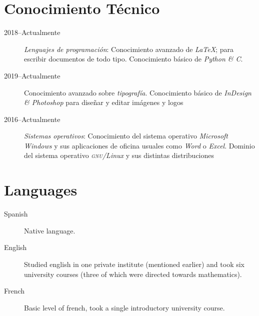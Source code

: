 \documentclass[draft,letterpaper,10pt]{article}
\newcommand{\entryone}[2]{
{\noindent\textsc{#1}}
\begin{quotation}
	\noindent#2.
\end{quotation}
}
\let\oldtextsc=\textsc
\renewcommand{\textsc}[1]{\oldtextsc{\MakeLowercase{#1}}}
\newcommand{\enraya}{–}
\begin{document}
\section*{Conocimiento Técnico}
\begin{description}
	\item[2018\enraya Actualmente] \emph{Lenguajes de programación}: Conocimiento avanzado de \emph{\LaTeX}; para escribir documentos de todo tipo. Conocimiento básico de \emph{Python \& C}.
	\item[2019\enraya Actualmente]Conocimiento avanzado sobre \emph{tipografía}. Conocimiento básico de \emph{InDesign \& Photoshop} para diseñar y editar imágenes y logos
	\item[2016\enraya Actualmente] \emph{Sistemas operativos}: Conocimiento del sistema operativo \emph{Microsoft Windows} y sus aplicaciones de oficina usuales como \emph{Word} o \emph{Excel}. Dominio del sistema operativo \emph{\textsc{gnu}/Linux} y sus distintas distribuciones
\end{description}

\section*{Languages}
\begin{description}
	\item[Spanish] Native language.
	\item[English] Studied english in one private institute (mentioned earlier) and took six university courses (three of which were directed towards mathematics).
	\item[French] Basic level of french, took a single introductory university course.
\end{description}
\end{document}
